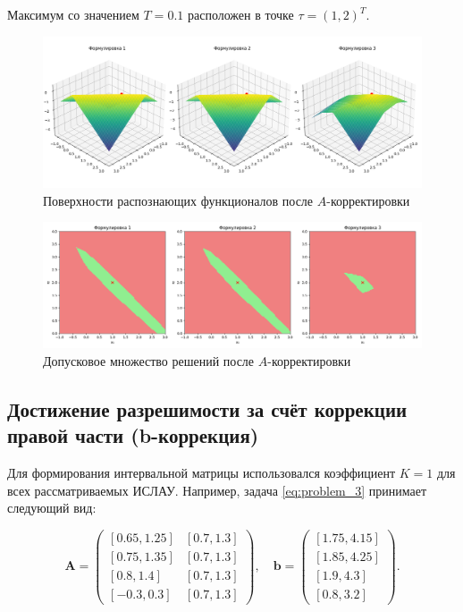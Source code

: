 \documentclass{article}
\begin{document}
  Максимум со значением \( T = 0.1 \) расположен в точке
  \( \tau = (1, 2)^T \).

  \begin{figure}[H]
		\begin{center}
			\includegraphics[width = \textwidth]{tol_a_corrected}
			\caption{Поверхности распознающих функционалов после
        \( A \)-корректировки}
      \label{figure:tol_a_corrected}
		\end{center}
	\end{figure}

  \begin{figure}[H]
		\begin{center}
			\includegraphics[width = \textwidth]{tol_functional_a_corrected}
			\caption{Допусковое множество решений после \( A \)-корректировки}
      \label{figure:tol_functional_a_corrected}
		\end{center}
	\end{figure}

\subsection{Достижение разрешимости за счёт коррекции правой части (b-коррекция)}

Для формирования интервальной матрицы использовался коэффициент \( K = 1 \) для всех рассматриваемых ИСЛАУ. Например, задача \ref{eq:problem_3} принимает следующий вид:

\[
\mathbf{A} = \begin{pmatrix}
  [0.65, 1.25] & [0.7, 1.3] \\
  [0.75, 1.35] & [0.7, 1.3] \\
  [0.8, 1.4] & [0.7, 1.3] \\
  [-0.3, 0.3] & [0.7, 1.3]
\end{pmatrix}, \quad
\mathbf{b} = \begin{pmatrix}
  [1.75, 4.15] \\
  [1.85, 4.25] \\
  [1.9, 4.3] \\
  [0.8, 3.2]
\end{pmatrix}.
\]
\end{document}

